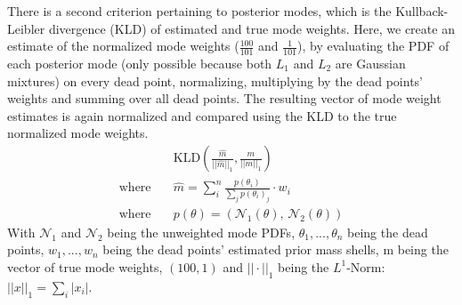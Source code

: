 \documentclass[12pt, a4paper]{report}
\begin{document}
There is a second criterion pertaining to posterior modes, which is the Kullback-Leibler divergence (KLD) of estimated and true mode weights.
Here, we create an estimate of the normalized mode weights ($\frac{100}{101}$ and $\frac{1}{101}$), by evaluating the PDF of each posterior mode (only possible because both $L_1$ and $L_2$ are Gaussian mixtures) on every dead point, normalizing, multiplying by the dead points' weights and summing over all dead points.
The resulting vector of mode weight estimates is again normalized and compared using the KLD to the true normalized mode weights.
\begin{align*}
    &\textrm{KLD}(\frac{\hat{m}}{||\hat{m}||_1}, \frac{m}{||m||_1}) \\
    \textrm{where} \quad &\hat{m} = \sum_i^n \frac{p(\theta_i)}{\sum_j p(\theta_i)_j} \cdot w_i \\
    \textrm{where} \quad &p(\theta) = (\mathcal{N}_1(\theta), \, \mathcal{N}_2(\theta))
\end{align*}
With $\mathcal{N}_1$ and $\mathcal{N}_2$ being the unweighted mode PDFs, $\theta_1, ..., \theta_n$ being the dead points, $w_1, ..., w_n$ being the dead points' estimated prior mass shells, m being the vector of true mode weights, $(100, 1)$ and $||\cdot||_1$ being the $L^1$-Norm: $||x||_1 = \sum_i |x_i|$.
\end{document}
